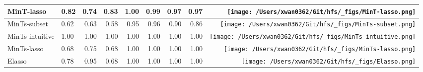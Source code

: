 \documentclass[
  letterpaper,
  DIV=11,
  numbers=noendperiod]{scrartcl}
\begin{document}
\begin{table}[!h]
{\begin{tabular}{llrrrrrr>{}r}
MinT-lasso & 0.82 & 0.74 & 0.83 & 1.00 & 0.99 & 0.97 & 0.97 & \texttt{[image: /Users/xwan0362/Git/hfs/\_figs/MinT-lasso.png]}\\
\midrule
MinTs-subset & 0.62 & 0.63 & 0.58 & 0.95 & 0.96 & 0.90 & 0.86 & \texttt{[image: /Users/xwan0362/Git/hfs/\_figs/MinTs-subset.png]}\\
MinTs-intuitive & 1.00 & 1.00 & 1.00 & 1.00 & 1.00 & 1.00 & 1.00 & \texttt{[image: /Users/xwan0362/Git/hfs/\_figs/MinTs-intuitive.png]}\\
MinTs-lasso & 0.68 & 0.75 & 0.68 & 1.00 & 1.00 & 1.00 & 1.00 & \texttt{[image: /Users/xwan0362/Git/hfs/\_figs/MinTs-lasso.png]}\\
\midrule
Elasso & 0.78 & 0.95 & 0.68 & 1.00 & 1.00 & 1.00 & 1.00 & \texttt{[image: /Users/xwan0362/Git/hfs/\_figs/Elasso.png]}\\
\bottomrule
\end{tabular}}
\end{table}
\end{document}

